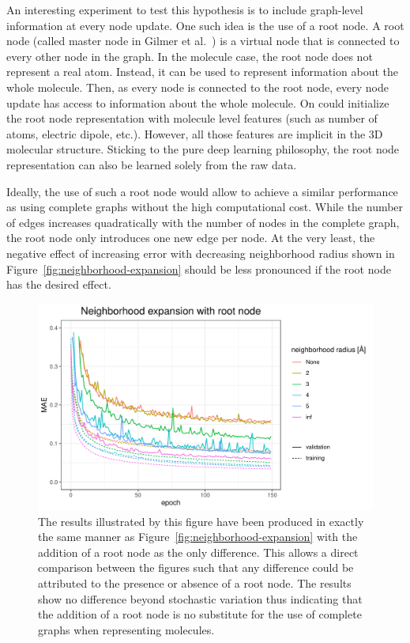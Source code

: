 An interesting experiment to test this hypothesis is to include graph-level information at every node update. One such idea is the use of a root node. A root node (called master node in Gilmer et al.~\cite{Gilmer2017}) is a virtual node that is connected to every other node in the graph. In the molecule case, the root node does not represent a real atom. Instead, it can be used to represent information about the whole molecule. Then, as every node is connected to the root node, every node update has access to information about the whole molecule. On could initialize the root node representation with molecule level features (such as number of atoms, electric dipole, etc.). However, all those features are implicit in the 3D molecular structure. Sticking to the pure deep learning philosophy, the root node representation can also be learned solely from the raw data.

Ideally, the use of such a root node would allow to achieve a similar performance as using complete graphs without the high computational cost. While the number of edges increases quadratically with the number of nodes in the complete graph, the root node only introduces one new edge per node. At the very least, the negative effect of increasing error with decreasing neighborhood radius shown in Figure~\ref{fig:neighborhood-expansion} should be less pronounced if the root node has the desired effect.

\begin{figure}[H]
	\includegraphics[width=\linewidth]{figures/neighborhood-expansion-root-weight}
	\caption{The results illustrated by this figure have been produced in exactly the same manner as Figure~\ref{fig:neighborhood-expansion} with the addition of a root node as the only difference. This allows a direct comparison between the figures such that any difference could be attributed to the presence or absence of a root node. The results show no difference beyond stochastic variation thus indicating that the addition of a root node is no substitute for the use of complete graphs when representing molecules.}
	\label{fig:neighborhood-expansion-root-weight}
\end{figure}

